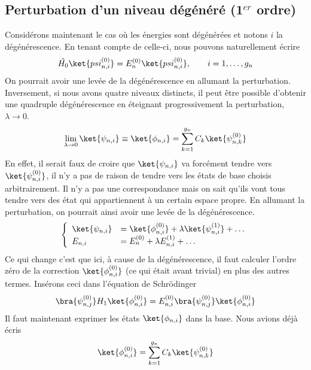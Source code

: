 	\subsection{Perturbation d'un niveau dégénéré (1$^{er}$ ordre)}
	Considérons maintenant le cas où les énergies sont dégénérées et notons $i$ la 
	dégénérescence. En tenant compte de celle-ci, nous pouvons naturellement écrire
	\begin{equation}
	\hat{H_0}\ket{psi_{n,i}^{(0)}} = E_n^{(0)}\ket{psi_{n,i}^{(0)}},\qquad i=1,\dots, g_n
	\end{equation}
	On pourrait avoir une levée de la dégénérescence en allumant la 
	perturbation. Inversement, si nous avons quatre niveaux distincts, il peut être possible 
	d'obtenir une quadruple dégénérescence en éteignant progressivement la perturbation, 
	$\lambda\to 0$.
	\begin{equation}
	\lim\limits_{\lambda\to 0} \ket{\psi_{n,i}} \equiv \ket{\phi_{n,i}} = \sum_{k=1}^{g_n} C_k 
	\ket{\psi_{n,k}^{(0)}}
	\end{equation}
	En effet, il serait faux de croire que $\ket{\psi_{n,i}}$ va forcément tendre vers 
	$\ket{\psi_{n,i}^{(0)}}$, il n'y a pas de raison de tendre vers les états de base 
	choisis arbitrairement. Il n'y a pas une correspondance mais on sait qu'ils vont 
	tous tendre vers des état qui appartiennent à un certain espace propre. En allumant 
	la perturbation, on pourrait ainsi avoir une levée de la dégénérescence.	
	\begin{equation}
	\left\{\begin{array}{ll}
	\ket{\psi_{n,i}} &= \ket{\phi_{n,i}^{(0)}} + \lambda\ket{\psi_{n,i}^{(1)}} + \dots\\
	E_{n,i} &= E_n^{(0)} + \lambda E_{n,i}^{(1)} + \dots
	\end{array}\right.
	\end{equation}
	Ce qui change c'est que ici, à cause de la dégénérescence, il faut calculer l'ordre
	zéro de la correction $\ket{\phi_{n,i}^{(0)}}$ (ce qui était avant trivial) en plus 
	des autres termes. Insérons ceci dans l'équation de Schrödinger
	\begin{equation}
	\bra{\psi_{n,j}^{(0)}}H_1\ket{\phi_{n,i}^{(0)}} = E_{n,i}^{(0)}
	\bra{\psi_{n,j}^{(0)}}\ket{\phi_{n,i}^{(0)}}
	\end{equation}
	Il faut maintenant exprimer les états $\ket{\phi_{n,i}}$ dans la base. Nous avions déjà 
	écris	
	\begin{equation}
	\ket{\phi_{n,i}^{(0)}} = \sum_{k=1}^{g_n} C_k \ket{\psi_{n,k}^{(0)}}
	\end{equation}
